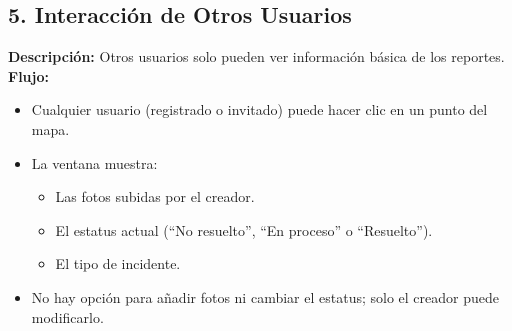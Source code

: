 \subsection{5. Interacción de Otros Usuarios}
\textbf{Descripción:} Otros usuarios solo pueden ver información básica de los reportes.\\
\textbf{Flujo:}
\begin{itemize}
    \item Cualquier usuario (registrado o invitado) puede hacer clic en un punto del mapa.
    \item La ventana muestra:
    \begin{itemize}
        \item Las fotos subidas por el creador.
        \item El estatus actual (``No resuelto'', ``En proceso'' o ``Resuelto'').
        \item El tipo de incidente.
    \end{itemize}
    \item No hay opción para añadir fotos ni cambiar el estatus; solo el creador puede modificarlo.
\end{itemize}